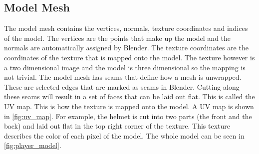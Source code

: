 \subsection{Model Mesh} \label{sec:theory_theory_models_mesh}
The model mesh contains the vertices, normals, texture coordinates and indices of the model.
The vertices are the points that make up the model and the normals are automatically assigned by Blender.
The texture coordinates are the coordinates of the texture that is mapped onto the model.
The texture however is a two dimensional image and the model is three dimensional so the mapping is not trivial.
The model mesh has seams that define how a mesh is unwrapped.
These are selected edges that are marked as seams in Blender.
Cutting along these seams will result in a set of faces that can be laid out flat.
This is called the UV map.
This is how the texture is mapped onto the model.
A UV map is shown in \autoref{fig:uv_map}.
For example, the helmet is cut into two parts (the front and the back) and laid out flat in the top right corner of the texture.
This texture describes the color of each pixel of the model.
The whole model can be seen in \autoref{fig:player_model}.

